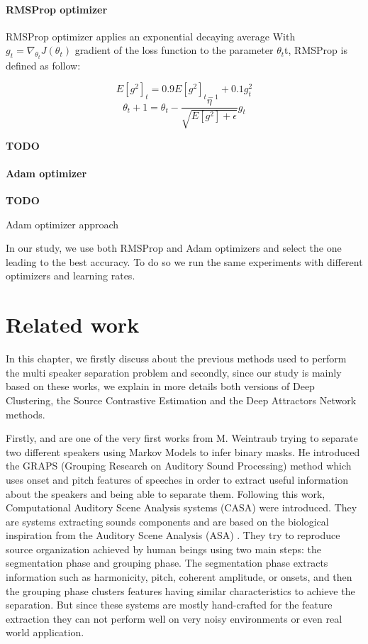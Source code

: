\documentclass[master,final,11pt]{iscs-thesis}
\begin{document}
\subsubsection{RMSProp optimizer}
RMSProp optimizer applies an exponential decaying average
With $g_t = \nabla_{\theta_t}J(\theta_t)$ gradient of the loss function to the parameter $\theta_t$t, RMSProp is defined as follow:

\[E[g^2]_t = 0.9E[g^2]_{t-1} +0.1g^2_t\]
\[\theta_t+1 = \theta_t - \frac{\eta}{\sqrt{E[g^2]+\epsilon}} g_t\]

\textbf{TODO}

\subsubsection{Adam optimizer}

\textbf{TODO}

Adam optimizer \cite{ADAM} approach 

In our study, we use both RMSProp and Adam optimizers and select the one leading to the best accuracy. To do so we run the same experiments with different optimizers and learning rates.

\chapter{Related work}

In this chapter, we firstly discuss about the previous methods used to perform the multi speaker separation problem and secondly, since our study is mainly based on these works, we explain in more details both versions of Deep Clustering, the Source Contrastive Estimation and the Deep Attractors Network methods.

Firstly, \cite{Weintraub:1985:TCM:912498} and \cite{ GRAPS} are one of the very first works from M. Weintraub trying to separate two different speakers using Markov Models to infer binary masks. He introduced the GRAPS (Grouping Research on Auditory Sound Processing) method which uses onset and pitch features of speeches in order to extract useful information about the speakers and being able to separate them.
Following this work, Computational Auditory Scene Analysis systems (CASA) \cite{CASA1, CASA2} were introduced. They are systems extracting sounds components and are based on the biological inspiration from the Auditory Scene Analysis (ASA) \cite{ASA}. They try to reproduce source organization achieved by human beings using two main steps: the segmentation phase and grouping phase.
The segmentation phase extracts information such as harmonicity, pitch, coherent amplitude, or onsets, and then the grouping phase clusters features having similar characteristics to achieve the separation. But since these systems are mostly hand-crafted for the feature extraction they can not perform well on very noisy environments or even real world application. 
\end{document}
